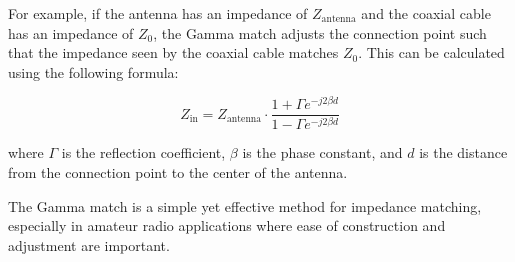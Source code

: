 For example, if the antenna has an impedance of \( Z_{\text{antenna}} \) and the coaxial cable has an impedance of \( Z_0 \), the Gamma match adjusts the connection point such that the impedance seen by the coaxial cable matches \( Z_0 \). This can be calculated using the following formula:

\[
Z_{\text{in}} = Z_{\text{antenna}} \cdot \frac{1 + \Gamma e^{-j2\beta d}}{1 - \Gamma e^{-j2\beta d}}
\]

where \( \Gamma \) is the reflection coefficient, \( \beta \) is the phase constant, and \( d \) is the distance from the connection point to the center of the antenna.

The Gamma match is a simple yet effective method for impedance matching, especially in amateur radio applications where ease of construction and adjustment are important.

